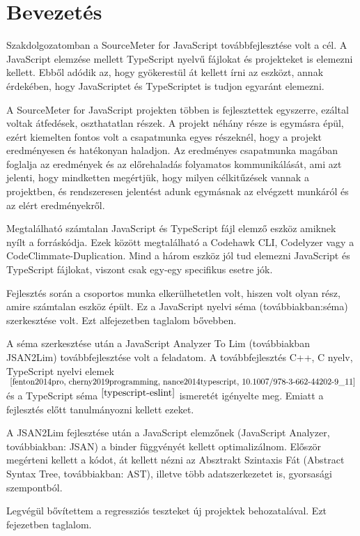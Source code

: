 \chapter{Bevezetés}

\noindent

Szakdolgozatomban a SourceMeter for JavaScript továbbfejlesztése volt a cél.
A JavaScript elemzése mellett TypeScript nyelvű fájlokat és projekteket is elemezni kellett.
Ebből adódik az, hogy gyökerestül át kellett írni az eszközt, annak érdekében,
hogy JavaScriptet és TypeScriptet is tudjon egyaránt elemezni.

\noindent

A SourceMeter for JavaScript projekten többen is fejlesztettek egyszerre, ezáltal voltak átfedések, oszthatatlan részek.
A projekt néhány része is egymásra épül, ezért kiemelten fontos volt a csapatmunka egyes részeknél, hogy a projekt eredményesen és hatékonyan haladjon.
Az eredményes csapatmunka magában foglalja az eredmények és az előrehaladás folyamatos kommunikálását,
ami azt jelenti, hogy mindketten megértjük, hogy milyen célkitűzések vannak a projektben,
és rendszeresen jelentést adunk egymásnak az elvégzett munkáról és az elért eredményekről.

\noindent

Megtalálható számtalan JavaScript és TypeScript fájl elemző eszköz amiknek nyílt a forráskódja.
Ezek között megtalálható a Codehawk CLI, Codelyzer vagy a CodeClimmate-Duplication.
Mind a három eszköz jól tud elemezni JavaScript és TypeScript fájlokat, viszont csak egy-egy specifikus esetre jók.

\noindent

Fejlesztés során a csoportos munka elkerülhetetlen volt, hiszen volt olyan rész, amire számtalan eszköz épült.
Ez a JavaScript nyelvi séma (továbbiakban:séma) szerkesztése volt. Ezt  alfejezetben taglalom bővebben.

\noindent

A séma szerkesztése után a JavaScript Analyzer To Lim (továbbiakban JSAN2Lim) továbbfejlesztése volt a feladatom.
A továbbfejlesztés C++, C nyelv, TypeScript nyelvi elemek$^{~\cite{fenton2014pro, cherny2019programming, nance2014typescript, 10.1007/978-3-662-44202-9_11}}$ és a TypeScript séma$^{~\cite{typescript-eslint}}$ ismeretét igényelte meg.
Emiatt a fejlesztés előtt tanulmányozni kellett ezeket.

\noindent

A JSAN2Lim fejlesztése után a JavaScript elemzőnek (JavaScript Analyzer, továbbiakban: JSAN) a binder függvényét kellett optimalizálnom.
Először megérteni kellett a kódot, át kellett nézni az Absztrakt Szintaxis Fát (Abstract Syntax Tree, továbbiakban: AST), illetve több adatszerkezetet is, gyorsasági szempontból.

\noindent

Legvégül bővítettem a regressziós teszteket új projektek behozatalával. Ezt  fejezetben taglalom.
